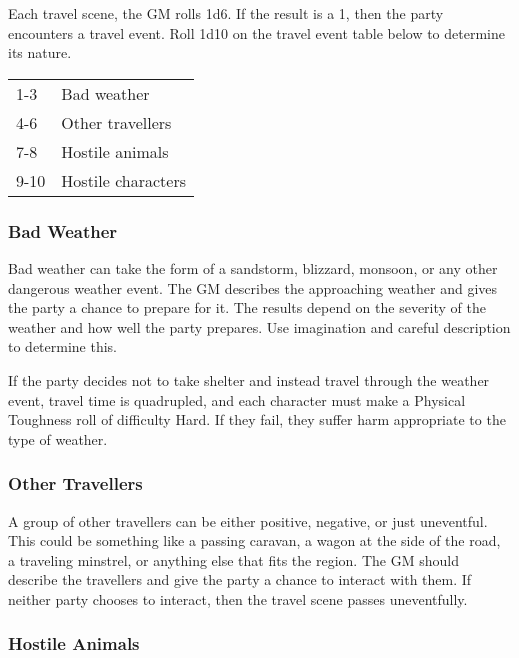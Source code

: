 \begin{multicols}{2}
Each travel scene, the GM rolls 1d6. If the result is a 1, then the
party encounters a travel event. Roll 1d10 on the travel event table below
to determine its nature.

\begin{center}
{
\begin{xtabular}{|l|l|}
1-3 & Bad weather \\
4-6 & Other travellers \\
7-8 & Hostile animals \\
9-10 & Hostile characters \\
\hline
\end{xtabular}
}
\end{center}

\subsubsection{Bad Weather}

Bad weather can take the form of a sandstorm, blizzard, monsoon, or any other
dangerous weather event. The GM describes the approaching weather and gives the
party a chance to prepare for it. The results depend on the severity of the
weather and how well the party prepares. Use imagination and careful description
to determine this.

If the party decides not to take shelter and instead travel through the weather
event, travel time is quadrupled, and each character must make a Physical Toughness
roll of difficulty Hard. If they fail, they suffer harm appropriate to the type
of weather.

\subsubsection{Other Travellers}

A group of other travellers can be either positive, negative, or just uneventful.
This could be something like a passing caravan, a wagon at the side of the road,
a traveling minstrel, or anything else that fits the region. The GM should describe
the travellers and give the party a chance to interact with them. If neither party
chooses to interact, then the travel scene passes uneventfully.

\subsubsection{Hostile Animals}


\end{multicols}
